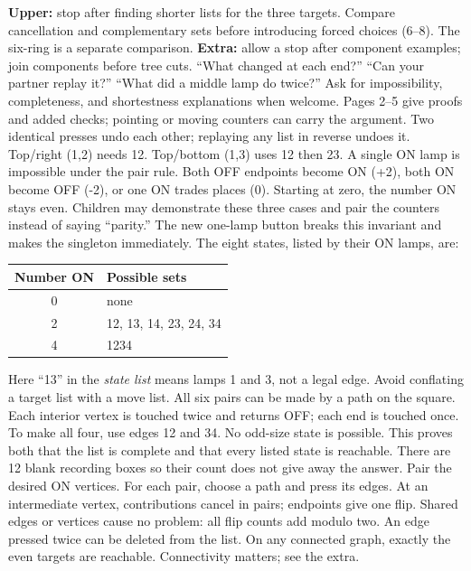 \documentclass[12pt]{extarticle}
\begin{document}
\textbf{Upper:} stop after finding shorter lists for the three targets. Compare cancellation and complementary sets before introducing forced choices (6--8). The six-ring is a separate comparison. \textbf{Extra:} allow a stop after component examples; join components before tree cuts.
``What changed at each end?'' ``Can your partner replay it?'' ``What did a middle lamp do twice?'' Ask for impossibility, completeness, and shortestness explanations when welcome. Pages 2--5 give proofs and added checks; pointing or moving counters can carry the argument.
\newpage
{}
Two identical presses undo each other; replaying any list in reverse undoes it. Top/right (1,2) needs 12. Top/bottom (1,3) uses 12 then 23. A single ON lamp is impossible under the pair rule. Both OFF endpoints become ON (+2), both ON become OFF (-2), or one ON trades places (0). Starting at zero, the number ON stays even. Children may demonstrate these three cases and pair the counters instead of saying ``parity.'' The new one-lamp button breaks this invariant and makes the singleton immediately.
The eight states, listed by their ON lamps, are:
\begin{center}\begin{tabular}{c|l}Number ON&Possible sets\\\hline 0&none\\2&12, 13, 14, 23, 24, 34\\4&1234\end{tabular}\end{center}
Here ``13'' in the \emph{state list} means lamps 1 and 3, not a legal edge. Avoid conflating a target list with a move list. All six pairs can be made by a path on the square. Each interior vertex is touched twice and returns OFF; each end is touched once. To make all four, use edges 12 and 34. No odd-size state is possible. This proves both that the list is complete and that every listed state is reachable. There are 12 blank recording boxes so their count does not give away the answer.
Pair the desired ON vertices. For each pair, choose a path and press its edges. At an intermediate vertex, contributions cancel in pairs; endpoints give one flip. Shared edges or vertices cause no problem: all flip counts add modulo two. An edge pressed twice can be deleted from the list. On any connected graph, exactly the even targets are reachable. Connectivity matters; see the extra.
\end{document}
